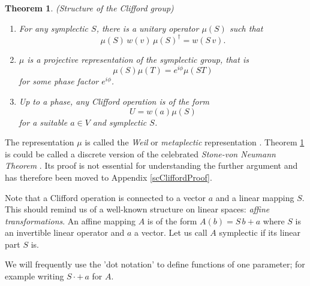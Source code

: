\documentclass[aps,twocolumn,floatfix]{revtex4}
\newtheorem{theorem}{Theorem}
\def\Symp#1,#2,#3,#4.{\left[\left(\begin{array}{c}#1\\#2\end{array}\right),\left(\begin{array}{c}#3\\#4\end{array}\right)\right]}
\begin{document}
\pagebreak
\begin{theorem} \emph{(Structure of the Clifford group)}
	\label{thCliffordStructure}
	\begin{enumerate}
		\item
		For any symplectic $S$, there is a unitary operator
		$\mu(S)$ such that
		\begin{equation*}
			\mu(S)\,w(v)\,\mu(S)^\dagger = w(S\,v).
		\end{equation*}

		\item
		$\mu$ is a \emph{projective representation} of the symplectic
		group, that is
		\begin{equation*}
			\mu(S)\mu(T)=e^{i \phi} \mu(ST)
		\end{equation*}
		for some phase factor $e^{i\phi}$.


		\item
		\label{cliffordDecomposition}
		Up to a phase, any Clifford operation is of the form
		\begin{equation*}
			U=w(a)\mu(S)
		\end{equation*}
		for a suitable $a\in V$ and symplectic $S$.
	\end{enumerate}
\end{theorem}

The representation $\mu$ is called the \emph{Weil} or
\emph{metaplectic} representation \cite{weil,folland}.  Theorem
\ref{thCliffordStructure} is could be called a discrete version of the
celebrated \emph{Stone-von Neumann Theorem} \cite{folland}. Its proof
is not essential for understanding the further argument and has
therefore been moved to Appendix \ref{scCliffordProof}.

Note that a Clifford operation is connected to a vector $a$ and a
linear mapping $S$. This should remind us of a well-known structure on
linear spaces: \emph{affine transformations}. An affine mapping $A$ is
of the form $A(b) = S\,b + a$ where $S$ is an invertible linear
operator and $a$ a vector.  Let us call $A$ symplectic if its linear
part $S$ is.

We will frequently use the 'dot notation' to define functions of one
parameter; for example writing $S\cdot+\,a$ for $A$.
\end{document}
